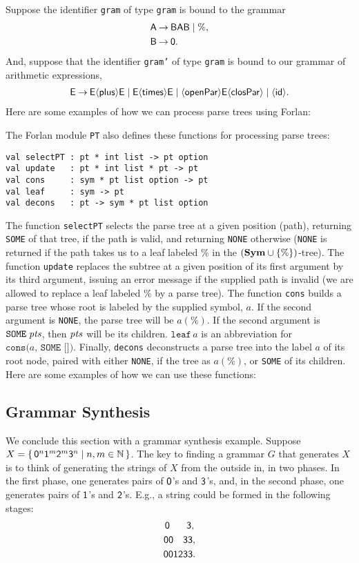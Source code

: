 Suppose the identifier \texttt{gram} of type \texttt{gram} is bound to the
grammar
\begin{align*}
\mathsf{A} &\mathbin{\to} \mathsf{B}\mathsf{A}\mathsf{B} \mid \% , \\
\mathsf{B} &\mathbin{\to} \mathsf{0} .
\end{align*}
And, suppose that the identifier
\texttt{gram'} of type \texttt{gram} is bound to our grammar of
arithmetic expressions,
\begin{gather*}
\mathsf{E\mathbin{\to} E{\langle\mathsf{plus}\rangle} E\mid E{\langle\mathsf{times}\rangle} E\mid {\langle\mathsf{openPar}\rangle} E{\langle\mathsf{closPar}\rangle} \mid
{\langle\mathsf{id}\rangle}} .
\end{gather*}
Here are some examples of how we can process parse trees using Forlan:


The Forlan module \texttt{PT} also defines these functions
for processing parse trees:
\begin{verbatim}
val selectPT : pt * int list -> pt option
val update   : pt * int list * pt -> pt
val cons     : sym * pt list option -> pt
val leaf     : sym -> pt
val decons   : pt -> sym * pt list option
\end{verbatim}
The function \texttt{selectPT} selects the parse tree at
a given position (path), returning \texttt{SOME} of that tree,
if the path is valid, and returning \texttt{NONE} otherwise
(\texttt{NONE} is returned if the path takes us to a leaf 
labeled $\%$ in the $(\mathbf{Sym}\cup\{\%\})$-tree). The
function \texttt{update} replaces the subtree at a given position
of its first argument by its third argument, issuing an error
message if the supplied path is invalid (we are allowed to replace
a leaf labeled $\%$ by a parse tree). The function \texttt{cons}
builds a parse tree whose root is labeled by the supplied symbol, $a$.
If the second argument is \texttt{NONE}, the parse tree will be $a(\%)$.
If the second argument is $\texttt{SOME}\;{\it pts}$, then ${\it pts}$ will be
its children. $\texttt{leaf}\,a$ is an abbreviation for
$\texttt{cons(}a\texttt{, SOME [])}$. Finally, \texttt{decons}
deconstructs a parse tree into the label $a$ of its root node, paired
with either \texttt{NONE}, if the tree as $a(\%)$, or \texttt{SOME}
of its children.
Here are some examples of how we can use these functions:


\subsection{Grammar Synthesis}

We conclude this section with a grammar synthesis example.  Suppose
$X=\{ \, \mathsf{0}^n\mathsf{1}^m\mathsf{2}^m\mathsf{3}^n \mid n,m\in\mathbb{N} \, \}$.  The key
to finding a grammar $G$ that generates $X$ is to think of generating
the strings of $X$ from the outside in, in two phases.  In the first
phase, one generates pairs of $\mathsf{0}$'s and $\mathsf{3}$'s, and, in
the second phase, one generates pairs of $\mathsf{1}$'s and $\mathsf{2}$'s.
E.g., a string could be formed in the following stages:
\begin{gather*}
{\mathsf{0\hspace{.6cm}3,}} \\
{\mathsf{00\hspace{.34cm}33,}} \\
{\mathsf{001233.}}
\end{gather*}

